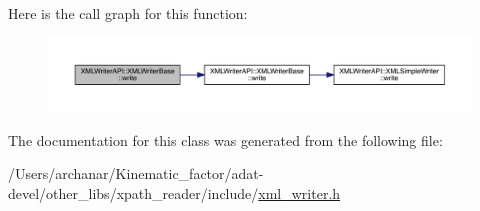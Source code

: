 Here is the call graph for this function\+:
\nopagebreak
\begin{figure}[H]
\begin{center}
\leavevmode
\includegraphics[width=350pt]{d5/df5/classXMLWriterAPI_1_1XMLWriterBase_a5475e21d716c65a21d620b4cde0c9ca1_cgraph}
\end{center}
\end{figure}


The documentation for this class was generated from the following file\+:\begin{DoxyCompactItemize}
\item 
/\+Users/archanar/\+Kinematic\+\_\+factor/adat-\/devel/other\+\_\+libs/xpath\+\_\+reader/include/\mbox{\hyperlink{adat-devel_2other__libs_2xpath__reader_2include_2xml__writer_8h}{xml\+\_\+writer.\+h}}\end{DoxyCompactItemize}
